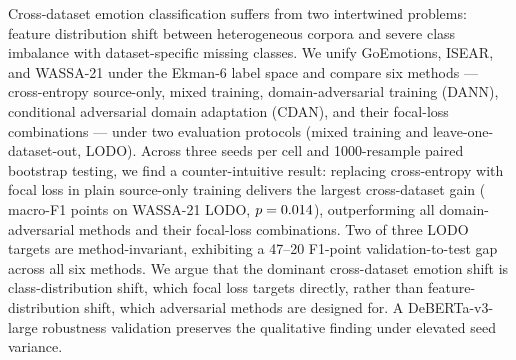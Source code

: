 
Cross-dataset emotion classification suffers from two intertwined
problems: feature distribution shift between heterogeneous corpora and
severe class imbalance with dataset-specific missing classes.
We unify GoEmotions, ISEAR, and WASSA-21 under the Ekman-6 label space
and compare six methods — cross-entropy source-only, mixed training,
domain-adversarial training (DANN), conditional adversarial domain
adaptation (CDAN), and their focal-loss combinations — under two
evaluation protocols (mixed training and leave-one-dataset-out, LODO).
Across three seeds per cell and 1000-resample paired bootstrap testing,
we find a counter-intuitive result: replacing cross-entropy with
focal loss in plain source-only training delivers the largest
cross-dataset gain (\focalwassagain{} macro-F1 points on WASSA-21 LODO,
$p=0.014$), outperforming all domain-adversarial methods and
their focal-loss combinations. Two of three LODO targets are
method-invariant, exhibiting a 47--20 F1-point validation-to-test gap
across all six methods. We argue that the dominant cross-dataset
emotion shift is class-distribution shift, which focal loss targets
directly, rather than feature-distribution shift, which adversarial
methods are designed for. A DeBERTa-v3-large robustness validation
preserves the qualitative finding under elevated seed variance.
